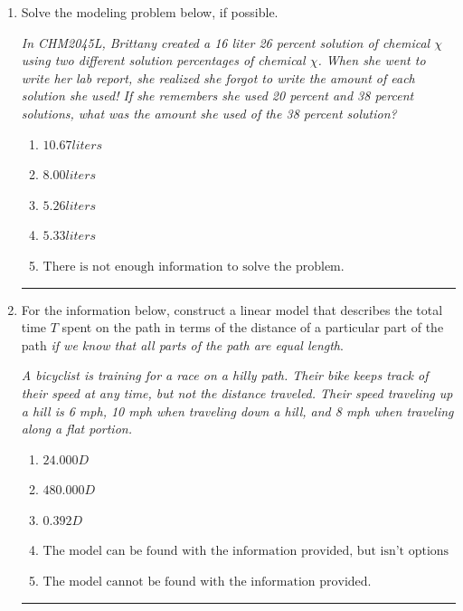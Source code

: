 \documentclass[14pt]{extbook}
\newcommand{\litem}[1]{\item#1\hspace*{-1cm}\rule{\textwidth}{0.4pt}}
\begin{document}
\begin{enumerate}
{\begin{enumerate}[label=\Alph*.]
\end{enumerate} }
\litem{
Solve the modeling problem below, if possible.
\begin{center}
    \textit{ In CHM2045L, Brittany created a 16 liter 26 percent solution of chemical $\chi$ using two different solution percentages of chemical $\chi$. When she went to write her lab report, she realized she forgot to write the amount of each solution she used! If she remembers she used 20 percent and 38 percent solutions, what was the amount she used of the 38 percent solution? }
\end{center}
\begin{enumerate}[label=\Alph*.]
\item \( 10.67 liters \)
\item \( 8.00 liters \)
\item \( 5.26 liters \)
\item \( 5.33 liters \)
\item \( \text{There is not enough information to solve the problem.} \)

\end{enumerate} }
\litem{
For the information below, construct a linear model that describes the total time $T$ spent on the path in terms of the distance of a particular part of the path \textit{if we know that all parts of the path are equal length}.
\begin{center}
    \textit{ A bicyclist is training for a race on a hilly path. Their bike keeps track of their speed at any time, but not the distance traveled. Their speed traveling up a hill is 6 mph, 10 mph when traveling down a hill, and 8 mph when traveling along a flat portion. }
\end{center}
\begin{enumerate}[label=\Alph*.]
\item \( 24.000 D \)
\item \( 480.000 D \)
\item \( 0.392 D \)
\item \( \text{The model can be found with the information provided, but isn't options 1-3.} \)
\item \( \text{The model cannot be found with the information provided.} \)


\end{enumerate}}
\end{enumerate}
\end{document}
